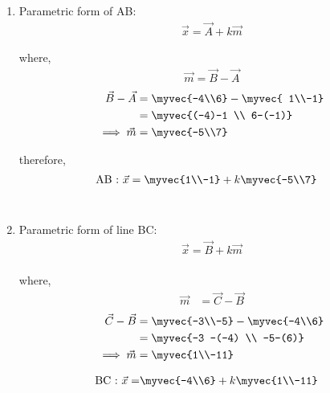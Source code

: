 \documentclass[journal,12pt,twocolumn]{IEEEtran}
\begin{document}
\begin{enumerate} 
\item Parametric form of AB: 
\begin{align}
\vec{x} = \vec{A} + k\vec{m}
\end{align}
  
where, 
\begin{align}
\vec{m} = \vec{B} - \vec{A}
\end{align}
\begin{align}
\vec{B} - \vec{A} &= \myvec{-4\\6} - \myvec{ 1\\-1}\\
&= \myvec{(-4)-1 \\ 6-(-1)}\\
\implies \vec {m} &= \myvec{-5\\7}
\end{align}
           
therefore,
\begin{align}
\text{AB : } \vec{x} &= \myvec{1\\-1} + k\myvec{-5\\7}
\end{align}\\

\item Parametric form of line BC:
\begin{align}
\vec{x} = \vec{B} + k\vec{m}
\end{align}\\
where, \begin{align}
\vec{m} &= \vec{C} - \vec{B}
\end{align}
\begin{align}
\vec{C}- \vec{B} &= \myvec{-3\\-5} - \myvec{-4\\6}\\
&= \myvec{-3 -(-4) \\ -5-(6)}\\
\implies \vec{m} &= \myvec{1\\-11}
\end{align}

\begin{align}
\text{BC : } \vec{x} =& \myvec{-4\\6} + k\myvec{1\\-11}
\end{align}


\end{enumerate}
\end{document}
